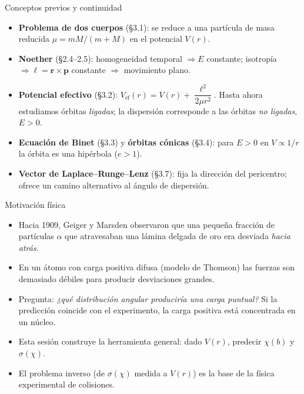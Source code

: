 \documentclass[aspectratio=169]{beamer}
\begin{document}
\begin{frame}{Conceptos previos y continuidad}
\begin{itemize}
  \item<1-> \textbf{Problema de dos cuerpos} (§3.1): se reduce a una partícula de masa
        reducida $\mu = mM/(m+M)$ en el potencial $V(r)$.
  \item<2-> \textbf{Noether} (§2.4–2.5): homogeneidad temporal $\Rightarrow E$ constante;
        isotropía $\Rightarrow \boldsymbol{\ell}=\mathbf r\times\mathbf p$ constante
        $\Rightarrow$ movimiento plano.
  \item<3-> \textbf{Potencial efectivo} (§3.2):
        $V_{\text{ef}}(r)=V(r)+\dfrac{\ell^2}{2\mu r^2}$.
        Hasta ahora estudiamos órbitas \emph{ligadas}; la dispersión corresponde a
        las órbitas \emph{no ligadas}, $E>0$.
  \item<4-> \textbf{Ecuación de Binet} (§3.3) y \textbf{órbitas cónicas} (§3.4):
        para $E>0$ en $V\propto 1/r$ la órbita es una hipérbola ($e>1$).
  \item<5-> \textbf{Vector de Laplace–Runge–Lenz} (§3.7): fija la dirección del pericentro;
        ofrece un camino alternativo al ángulo de dispersión.
\end{itemize}
\end{frame}

\begin{frame}{Motivación física}
\begin{itemize}
  \item<1-> Hacia 1909, Geiger y Marsden observaron que una pequeña fracción de partículas
        $\alpha$ que atravesaban una lámina delgada de oro era desviada \emph{hacia atrás}.
  \item<2-> En un átomo con carga positiva difusa (modelo de Thomson) las fuerzas
        son demasiado débiles para producir desviaciones grandes.
  \item<3-> Pregunta: \emph{¿qué distribución angular produciría una carga puntual?}
        Si la predicción coincide con el experimento, la carga positiva
        está concentrada en un núcleo.
  \item<4-> Esta sesión construye la herramienta general: dado $V(r)$,
        predecir $\chi(b)$ y $\sigma(\chi)$.
  \item<5-> El problema inverso (de $\sigma(\chi)$ medida a $V(r)$) es la base
        de la física experimental de colisiones.
\end{itemize}
\end{frame}
\end{document}
